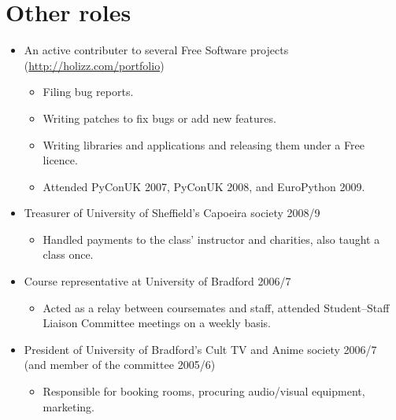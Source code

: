 \documentclass{article}
\newcommand{\iri}[1]{\url{#1}}
\begin{document}
\section{Other roles}
\begin{itemize}
\item An active contributer to several Free Software projects (\iri{http://holizz.com/portfolio})
  \begin{itemize}
  \item Filing bug reports.
  \item Writing patches to fix bugs or add new features.
  \item Writing libraries and applications and releasing them under a Free licence.
  \item Attended PyConUK 2007, PyConUK 2008, and EuroPython 2009.
  \end{itemize}
\item Treasurer of University of Sheffield's Capoeira society 2008/9
  \begin{itemize}
  \item Handled payments to the class' instructor and charities, also taught a class once.
  \end{itemize}
\item Course representative at University of Bradford 2006/7
  \begin{itemize}
  \item Acted as a relay between coursemates and staff, attended Student--Staff Liaison Committee meetings on a weekly basis.
  \end{itemize}
\item President of University of Bradford's Cult TV and Anime society 2006/7 (and member of the committee 2005/6)
  \begin{itemize}
  \item Responsible for booking rooms, procuring audio/visual equipment, marketing.
  \end{itemize}
\end{itemize}

\break
\end{document}
